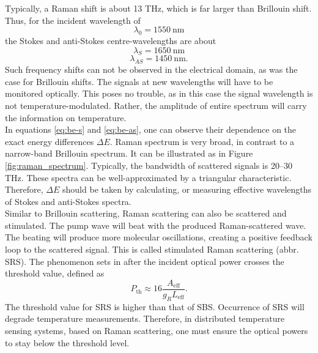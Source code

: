 \documentclass{standalone}
\begin{document}
Typically, a Raman shift is about 13 THz, which is far larger than Brillouin shift. Thus, for the incident wavelength of
\begin{equation}
\lambda_0 = \SI{1550}{\nano \meter}
\end{equation}
the Stokes and anti-Stokes centre-wavelengths are about
\begin{equation}
\lambda_S = \SI{1650}{\nano \meter}
\end{equation}
\begin{equation}
\lambda_{AS} = \SI{1450}{\nano \meter} \textrm{.}
\end{equation}
Such frequency shifts can not be observed in the electrical domain, as was the case for Brillouin shifts. The signals at new wavelengths will have to be monitored optically. This poses no trouble, as in this case the signal wavelength is not temperature-modulated. Rather, the amplitude of entire spectrum will carry the information on temperature. \\

In equations \ref{eq:be-s} and \ref{eq:be-as}, one can observe their dependence on the exact energy differences $\varDelta E$. Raman spectrum is very broad, in contrast to a narrow-band Brillouin spectrum. It can be illustrated as in Figure \ref{fig:raman_spectrum}.
Typically, the bandwidth of scattered signals is 20--30 THz. These spectra can be well-approximated by a triangular characteristic. Therefore, $\varDelta E$ should be taken by calculating, or measuring effective wavelengths of Stokes and anti-Stokes spectra. \\

Similar to Brillouin scattering, Raman scattering can also be scattered and stimulated. The pump wave will beat with the produced Raman-scattered wave. The beating will produce more molecular oscillations, creating a positive feedback loop to the scattered signal. This is called stimulated Raman scattering (abbr. SRS). The phenomenon sets in after the incident optical power crosses the threshold value, defined as
\begin{equation}
P_\textrm{th} \approx 16 \frac{A_\textrm{eff}}{g_R L_\textrm{eff}} \textrm{.}
\end{equation}
The threshold value for SRS is higher than that of SBS. Occurrence of SRS will degrade temperature measurements. Therefore, in distributed temperature sensing systems, based on Raman scattering, one must ensure the optical powers to stay below the threshold level.




\setcounter{stranica}{\thepage}
\addtocounter{stranica}{1}
\end{document}
